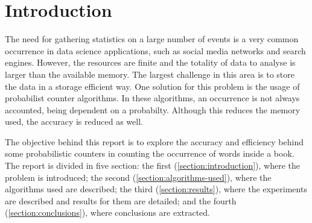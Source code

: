 \section{Introduction}\label{section:introduction}

The need for gathering statistics on a large number of events is a very common occurrence in data science applications, such as social media networks and search engines.
However, the resources are finite and the totality of data to analyse is larger than the available memory.
The largest challenge in this area is to store the data in a storage efficient way. %
One solution for this problem is the usage of probabilist counter algorithms.
In these algorithms, an occurrence is not always accounted, being dependent on a probabilty.
Although this reduces the memory used, the accuracy is reduced as well.


The objective behind this report is to explore the accuracy and efficiency behind some probabilistic counters in counting the occurrence of words inside a book.
The report is divided in five section: the first (\autoref{section:introduction}), where the problem is introduced;
the second (\autoref{section:algorithms-used}), where the algorithms used are described;
the third (\autoref{section:results}), where the experiments are described and results for them are detailed;
and the fourth (\autoref{section:conclusions}), where conclusions are extracted.
